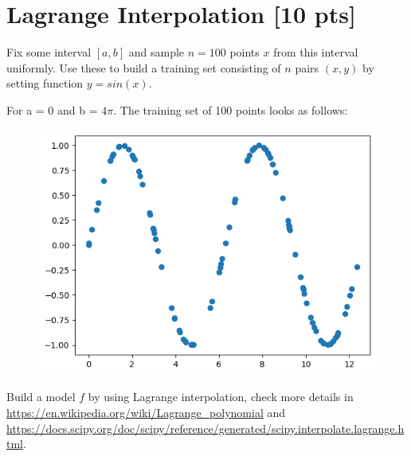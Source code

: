 \documentclass[a4paper]{article}
\theoremstyle{definition}
\newenvironment{soln}{
    \leavevmode\color{blue}\ignorespaces
}{}
\begin{document}
\section{Lagrange Interpolation [10 pts]}
Fix some interval $[a, b]$ and sample $n = 100$ points $x$ from this interval uniformly. Use these to build a training set consisting of $n$ pairs $(x, y)$ by setting function $y = sin(x)$. \\
\begin{soln}
    For a = 0 and b = $4\pi$. The training set of 100 points looks as follows:
    \begin{figure}[H]
        \centering
        \includegraphics[scale=0.4]{Images/DTlang_train.png}
        \label{fig:lang_train}
    \end{figure}
    
\end{soln}

Build a model $f$ by using Lagrange interpolation, check more details in \url{https://en.wikipedia.org/wiki/Lagrange_polynomial} and \url{https://docs.scipy.org/doc/scipy/reference/generated/scipy.interpolate.lagrange.html}. \\
\end{document}
